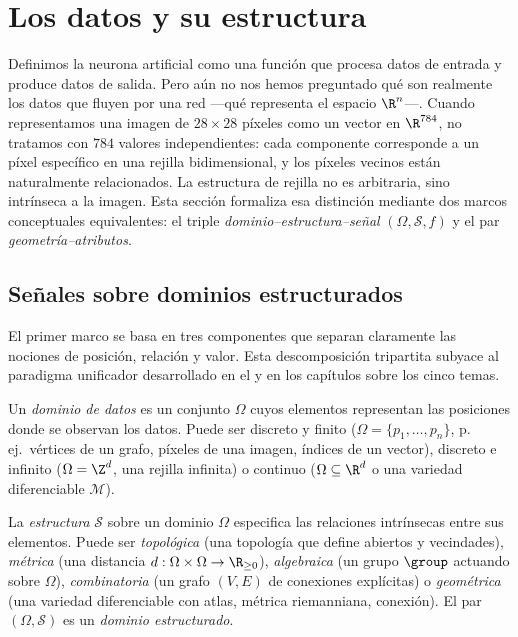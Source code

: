 \section{Los datos y su estructura}
\label{sec:found:data}

Definimos la neurona artificial como una funci\'on que procesa datos de entrada y
produce datos de salida. Pero a\'un no nos hemos preguntado qu\'e son realmente los
datos que fluyen por una red ---qu\'e representa el espacio $\R^n$---. Cuando
representamos una imagen de $28 \times 28$ p\'ixeles como un vector en $\R^{784}$,
no tratamos con $784$ valores independientes: cada componente corresponde a un
p\'ixel espec\'ifico en una rejilla bidimensional, y los p\'ixeles vecinos est\'an
naturalmente relacionados. La estructura de rejilla no es arbitraria, sino
intr\'inseca a la imagen. Esta secci\'on formaliza esa distinci\'on mediante dos
marcos conceptuales equivalentes: el triple \emph{dominio--estructura--se\~nal}
$(\Omega, \mathcal{S}, f)$ y el par \emph{geometr\'ia--atributos}.

\subsection{Se\~nales sobre dominios estructurados}
\label{sec:found:signals}

El primer marco se basa en tres componentes que separan claramente las nociones
de posici\'on, relaci\'on y valor. Esta descomposici\'on tripartita subyace al
paradigma unificador desarrollado en el  y en los cap\'itulos
sobre los cinco temas.

\begin{definition}
\label{def:found:domain}
Un \emph{dominio de datos} es un conjunto $\Omega$ cuyos elementos representan las
posiciones donde se observan los datos. Puede ser discreto y finito
($\Omega = \{p_1, \ldots, p_n\}$, p.\,ej.\ v\'ertices de un grafo, p\'ixeles de una
imagen, \'indices de un vector), discreto e infinito ($\Omega = \Z^d$, una rejilla
infinita) o continuo ($\Omega \subseteq \R^d$ o una variedad diferenciable
$\mathcal{M}$).
\end{definition}

\begin{definition}
\label{def:found:structure}
La \emph{estructura} $\mathcal{S}$ sobre un dominio $\Omega$ especifica las
relaciones intr\'insecas entre sus elementos. Puede ser \emph{topol\'ogica} (una
topolog\'ia que define abiertos y vecindades), \emph{m\'etrica} (una distancia
$d : \Omega \times \Omega \to \R_{\ge 0}$), \emph{algebraica} (un grupo $\group$
actuando sobre $\Omega$), \emph{combinatoria} (un grafo $(V,E)$ de conexiones
expl\'icitas) o \emph{geom\'etrica} (una variedad diferenciable con atlas, m\'etrica
riemanniana, conexi\'on). El par $(\Omega, \mathcal{S})$ es un \emph{dominio
estructurado}.
\end{definition}

